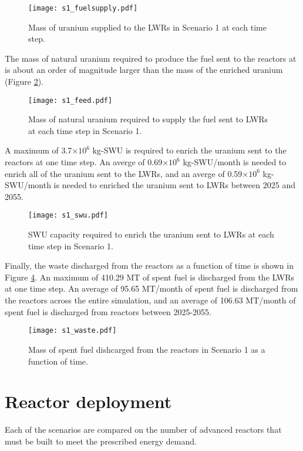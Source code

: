 \begin{figure}
    \centering
    \texttt{[image: s1\_fuelsupply.pdf]}
    \caption{Mass of uranium supplied to the LWRs in Scenario 1 at each time step.}
    \label{fig:fuel1}
\end{figure}

The mass of natural uranium required to produce the fuel sent to the reactors at 
is about an order of magnitude larger than the mass of the enriched uranium 
(Figure \ref{fig:feed1}). 

\begin{figure}
    \centering
    \texttt{[image: s1\_feed.pdf]}
    \caption{Mass of natural uranium required to supply the fuel sent to LWRs at each time step in Scenario 1.}
    \label{fig:feed1}
\end{figure}

A maximum of 3.7$\times 10^6$ kg-SWU is required to 
enrich the uranium sent to the reactors at one time step. An averge of 
0.69$\times 10^6$ kg-SWU/month is needed to enrich all of the uranium sent to 
the \glspl{LWR}, and an averge of 0.59$\times 10^6$ kg-SWU/month is needed to 
enriched the uranium sent to \glspl{LWR} between 2025 and 2055.


\begin{figure}
    \centering
    \texttt{[image: s1\_swu.pdf]}
    \caption{SWU capacity required to enrich the uranium sent to LWRs at each time step in Scenario 1.}
    \label{fig:swu1}
\end{figure}

Finally, the waste discharged from the reactors as a function of time is shown 
in Figure \ref{fig:waste1}. An maximum of 410.29 MT of spent fuel is discharged 
from the \glspl{LWR} at one time step. An average of 95.65 MT/month of spent fuel is 
discharged from the reactors across the entire simulation, and an average of 
106.63 MT/month of spent fuel is discharged from reactors between 2025-2055. 

\begin{figure}
    \centering
    \texttt{[image: s1\_waste.pdf]}
    \caption{Mass of spent fuel dishcarged from the reactors in Scenario 1 as a function of time.}
    \label{fig:waste1}
\end{figure}

\section{Reactor deployment}
Each of the scenarios are compared on the number of advanced reactors that must 
be built to meet the prescribed energy demand. 

